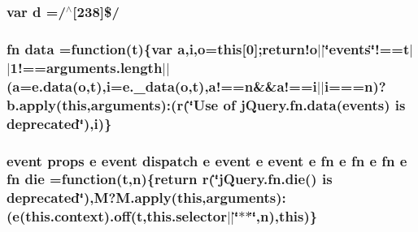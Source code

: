 \subsubsection[{d}]{\setlength{\rightskip}{0pt plus 5cm}var d =/$^\wedge$\mbox{[}238\mbox{]}\$/}\label{jquery-migrate-1_82_81_8min_8js_aeb337d295abaddb5ec3cb34cc2e2bbc9}
\hypertarget{jquery-migrate-1_82_81_8min_8js_a7f60fda3d1d4191e549df075eeacf25b}{}
\subsubsection[{data}]{ {\bf fn} data =function({\bf t})\{var {\bf a},{\bf i},{\bf o}={\bf this}\mbox{[}0\mbox{]};return!o$\vert$$\vert$\char`\"{}events\char`\"{}!==t$\vert$$\vert$1!==arguments.\+length$\vert$$\vert$({\bf a}=e.\+data({\bf o},{\bf t}),{\bf i}=e.\+\_\+data({\bf o},{\bf t}),a!=={\bf n}\&\&a!=={\bf i}$\vert$$\vert${\bf i}==={\bf n})?b.\+apply({\bf this},arguments)\+:({\bf r}(\char`\"{}Use of j\+Query.\+fn.\+data(\textquotesingle{}events\textquotesingle{}) is deprecated\char`\"{}),i)\}}\label{jquery-migrate-1_82_81_8min_8js_a7f60fda3d1d4191e549df075eeacf25b}
\hypertarget{jquery-migrate-1_82_81_8min_8js_a8000af92246746444c1d08e9650d86af}{}
\subsubsection[{die}]{ {\bf event} props {\bf e} {\bf event} {\bf dispatch} {\bf e} {\bf event} {\bf e} {\bf event} {\bf e} {\bf fn} {\bf e} {\bf fn} {\bf e} {\bf fn} {\bf e} {\bf fn} die =function({\bf t},{\bf n})\{return {\bf r}(\char`\"{}j\+Query.\+fn.\+die() is deprecated\char`\"{}),M?M.\+apply({\bf this},arguments)\+:({\bf e}(this.\+context).off({\bf t},this.\+selector$\vert$$\vert$\char`\"{}$\ast$$\ast$\char`\"{},{\bf n}),{\bf this})\}}\label{jquery-migrate-1_82_81_8min_8js_a8000af92246746444c1d08e9650d86af}
\hypertarget{jquery-migrate-1_82_81_8min_8js_a2c038346d47955cbe2cb91e338edd7e1}{}
